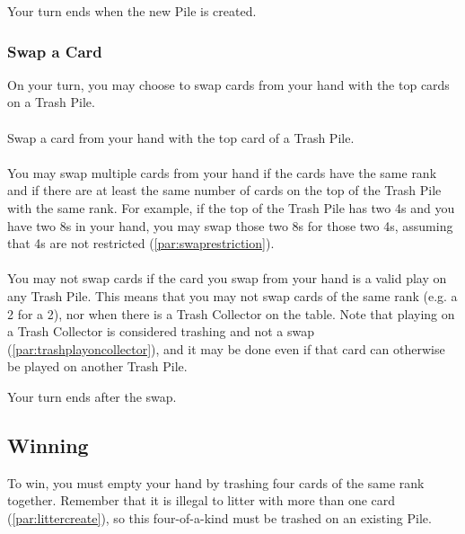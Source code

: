 \documentclass{article}
\begin{document}
Your turn ends when the new Pile is created.

\newpage
\subsubsection{Swap a Card \label{sec:swap}}

On your turn, you may choose to swap cards from your hand with the top cards on a Trash Pile.

\paragraph{\label{par:swaptop}}
Swap a card from your hand with the top card of a Trash Pile.

\paragraph{\label{par:swapmultiple}}
You may swap multiple cards from your hand if the cards have the same rank and if there are at least the same number of cards on the top of the Trash Pile with the same rank. For example, if the top of the Trash Pile has two 4s and you have two 8s in your hand, you may swap those two 8s for those two 4s, assuming that 4s are not restricted (\autoref{par:swaprestriction}).

\paragraph{\label{par:swaprestriction}}
You may not swap cards if the card you swap from your hand is a valid play on any Trash Pile. This means that you may not swap cards of the same rank (e.g. a 2 for a 2), nor when there is a Trash Collector on the table. Note that playing on a Trash Collector is considered trashing and not a swap (\autoref{par:trashplayoncollector}), and it may be done even if that card can otherwise be played on another Trash Pile.

Your turn ends after the swap.

\subsection{Winning \label{sec:winning}}

To win, you must empty your hand by trashing four cards of the same rank together. Remember that it is illegal to litter with more than one card (\autoref{par:littercreate}), so this four-of-a-kind must be trashed on an existing Pile.
\end{document}

